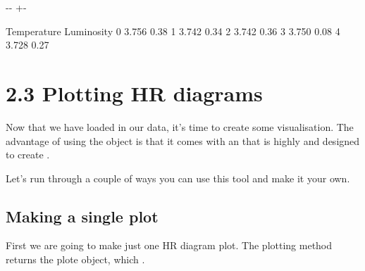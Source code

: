 \documentclass[letterpaper,10pt,english]{sphinxmanual}
\newlength\nbsphinxcodecellspacing
\begin{document}
{
%
\begin{sphinxVerbatim}[commandchars=\\\{\}]
\llap{\color{nbsphinxin}[12]:\,\hspace{\fboxrule}\hspace{\fboxsep}}
\end{sphinxVerbatim}
}

{

\kern-\sphinxverbatimsmallskipamount\kern-\baselineskip
\kern+\FrameHeightAdjust\kern-\fboxrule
\vspace{\nbsphinxcodecellspacing}

%
\begin{sphinxVerbatim}[commandchars=\\\{\}]
\llap{\color{nbsphinxout}[12]:\,\hspace{\fboxrule}\hspace{\fboxsep}}   Temperature  Luminosity
0        3.756        0.38
1        3.742        0.34
2        3.742        0.36
3        3.750        0.08
4        3.728        0.27
\end{sphinxVerbatim}
}


\section{2.3 Plotting HR diagrams}
\label{\detokenize{HR_diagrams:2.3-Plotting-HR-diagrams}}
Now that we have loaded in our data, it’s time to create some visualisation. The advantage of using the  object is that it comes with an  that is highly  and designed to create .

Let’s run through a couple of ways you can use this tool and make it your own.


\subsection{Making a single plot}
\label{\detokenize{HR_diagrams:Making-a-single-plot}}
First we are going to make just one HR diagram plot. The plotting method returns the plote object, which .
\end{document}

